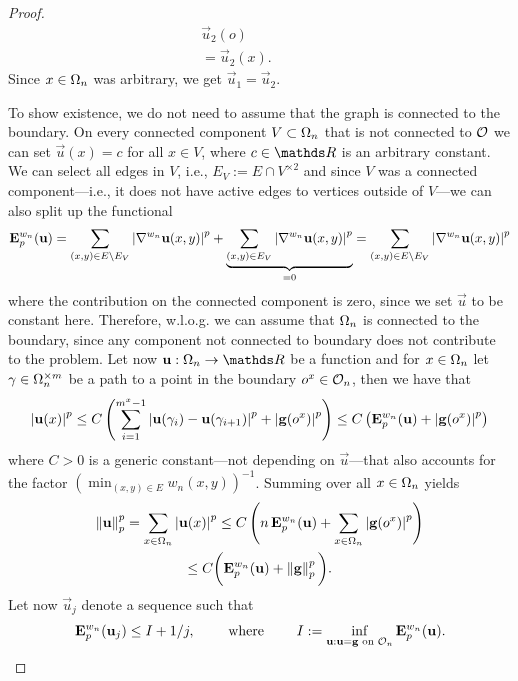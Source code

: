 \begin{proof}
\begin{align*}
\vec u_2(o)\\
%
=\vec u_2(x).\phantom{--..}&
\end{align*}
%
Since $x\in\Omega_n$ was arbitrary, we get $\vec u_1 = \vec u_2$.\par
%
\noindent%
To show existence, we do not need to assume that the graph is connected to the boundary. On every connected component $V\subset \Omega_n$ that is not connected to $\mathcal{O}$ we can set $\vec u(x) = c$ for all $x\in V$, where $c\in\R$ is an arbitrary constant. We can select all edges in $V$, i.e., $E_V := E \cap V^{\times 2}$ and since $V$ was a connected component---i.e., it does not have active edges to vertices outside of $V$---we can also split up the functional
%
\begin{align*}
\mathbf{E}^{w_n}_{p}(\mathbf{u}) = \sum_{(x,y)\in E\setminus E_V} \left|\nabla^{w_n} \mathbf{u}(x,y)\right|^p
+
\underbrace{\sum_{(x,y)\in E_V} \left|\nabla^{w_n} \mathbf{u}(x,y)\right|^p}_{=0} = 
\sum_{(x,y)\in E\setminus E_V} \left|\nabla^{w_n} \mathbf{u}(x,y)\right|^p
\end{align*}
%
where the contribution on the connected component is zero, since we set $\vec u$ to be constant here. Therefore, w.l.o.g. we can assume that $\Omega_n$ is connected to the boundary, since any component not connected to boundary does not contribute to the problem. Let now $\vec u:\domain_n\to\R$ be a function and for $x\in\Omega_n$ let $\gamma \in \Omega_n^{\times m}$ be a path to a point in the boundary $o^x\in\mathcal{O}_n$, then we have that
%
\begin{gather*}
\left|\mathbf{u}(x)\right|^p \leq C\left(\sum_{i=1}^{m^x-1}\left|\mathbf{u}(\gamma_{i}) - \mathbf{u}(\gamma_{i+1})\right|^p + \left|\mathbf{g}(o^x)\right|^p\right) \leq 
C\left(\mathbf{E}^{w_n}_p(\mathbf{u}) + \left|\mathbf{g}(o^x)\right|^p\right)
\end{gather*}
%
where $C>0$ is a generic constant---not depending on $\vec u$---that also accounts for the factor $\left(\min_{(x,y)\in E}w_n(x,y)\right)^{-1}$. Summing over all $x\in\Omega_n$ yields
%
\begin{gather*}
\norm{\vec u}^p_p = \sum_{x\in\domain_n} \abs{\vec u(x)}^p \leq 
C\left( n\, \GE^{w_n}_p(\vec u) + \sum_{x\in\domain_n} \abs{\vec g(o^x)}^p\right)\\
%
\leq  C \bigg(\GE^{w_n}_p(\vec u) + \norm{\vec g}^p_p\bigg).
\end{gather*}
%
Let now $\vec u_j$ denote a sequence such that
%
\begin{align*}
\GE^{w_n}_p(\vec u_j) \leq I + 1/j,\qquad\text{ where }\qquad
I := \inf_{\vec u:\vec u=\vec g\text{ on } \conset_n} \GE^{w_n}_p(\vec u).

\end{align*}
\end{proof}
